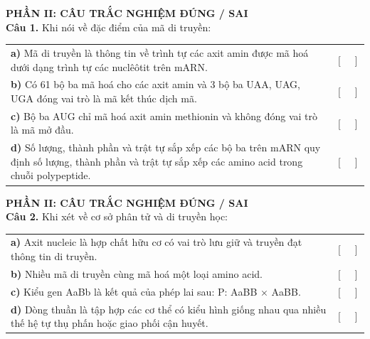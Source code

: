\documentclass{article}
\begin{document}
\begin{minipage}[t][14.4cm][t]{\linewidth}
\fontsize{22}{29}\selectfont
{\color{brandGreen}\textbf{PHẦN II: CÂU TRẮC NGHIỆM ĐÚNG / SAI}\\[8pt]}
\textbf{Câu 1.} Khi nói về đặc điểm của mã di truyền:
\vspace{8pt}

\begin{tabularx}{\linewidth}{@{}X r@{}}

\textbf{a) } Mã di truyền là thông tin về trình tự các axit amin được mã hoá dưới dạng trình tự các nuclêôtit trên mARN. & $[\quad]$\\[8pt]
\textbf{b) } Có 61 bộ ba mã hoá cho các axit amin và 3 bộ ba UAA, UAG, UGA đóng vai trò là mã kết thúc dịch mã. & $[\quad]$\\[8pt]
\textbf{c) } Bộ ba AUG chỉ mã hoá axit amin methionin và không đóng vai trò là mã mở đầu. & $[\quad]$\\[8pt]
\textbf{d) } Số lượng, thành phần và trật tự sắp xếp các bộ ba trên mARN quy định số lượng, thành phần và trật tự sắp xếp các amino acid trong chuỗi polypeptide. & $[\quad]$\\[8pt]
\end{tabularx}
\vfill
\end{minipage}
\newpage


\begin{minipage}[t][14.4cm][t]{\linewidth}
\fontsize{25}{33}\selectfont
{\color{brandGreen}\textbf{PHẦN II: CÂU TRẮC NGHIỆM ĐÚNG / SAI}\\[8pt]}
\textbf{Câu 2.} Khi xét về cơ sở phân tử và di truyền học:
\vspace{8pt}

\begin{tabularx}{\linewidth}{@{}X r@{}}

\textbf{a) } Axit nucleic là hợp chất hữu cơ có vai trò lưu giữ và truyền đạt thông tin di truyền. & $[\quad]$\\[8pt]
\textbf{b) } Nhiều mã di truyền cùng mã hoá một loại amino acid. & $[\quad]$\\[8pt]
\textbf{c) } Kiểu gen AaBb là kết quả của phép lai sau: P: AaBB × AaBB. & $[\quad]$\\[8pt]
\textbf{d) } Dòng thuần là tập hợp các cơ thể có kiểu hình giống nhau qua nhiều thế hệ tự thụ phấn hoặc giao phối cận huyết. & $[\quad]$\\[8pt]
\end{tabularx}
\vfill
\end{minipage}
\newpage
\end{document}
